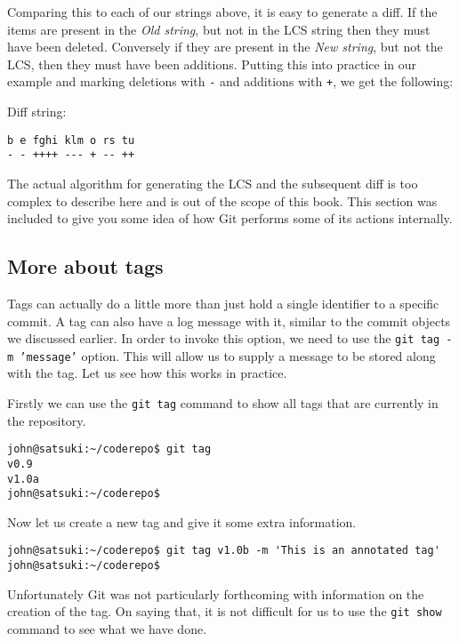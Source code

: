 Comparing this to each of our strings above, it is easy to generate a diff.  If the items are present in the \emph{Old string}, but not in the LCS string then they must have been deleted.  Conversely if they are present in the \emph{New string}, but not the LCS, then they must have been additions.  Putting this into practice in our example and marking deletions with \texttt{-} and additions with \texttt{+}, we get the following:

Diff string:
\begin{Verbatim}
b e fghi klm o rs tu
- - ++++ --- + -- ++
\end{Verbatim}

The actual algorithm for generating the LCS and the subsequent diff is too complex to describe here and is out of the scope of this book.  This section was included to give you some idea of how Git performs some of its actions internally.

\subsection{More about tags}
Tags can actually do a little more than just hold a single identifier to a specific commit.  A tag can also have a log message with it, similar to the commit objects we discussed earlier.  In order to invoke this option, we need to use the \texttt{git tag -m 'message'} option.  This will allow us to supply a message to be stored along with the tag.  Let us see how this works in practice.

Firstly we can use the \texttt{git tag} command to show all tags that are currently in the repository.

\begin{Verbatim}
john@satsuki:~/coderepo$ git tag
v0.9
v1.0a
john@satsuki:~/coderepo$ 
\end{Verbatim}

Now let us create a new tag and give it some extra information.

\begin{Verbatim}
john@satsuki:~/coderepo$ git tag v1.0b -m 'This is an annotated tag'
john@satsuki:~/coderepo$ 
\end{Verbatim}

Unfortunately Git was not particularly forthcoming with information on the creation of the tag.  On saying that, it is not difficult for us to use the \texttt{git show} command to see what we have done.

